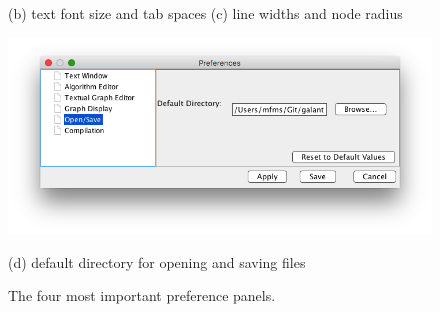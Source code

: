 \begin{figure}
  \vspace{-5ex}

  \hspace*{-2em}
  (b) text font size and tab spaces
  \hspace{3em}
  (c) line widths and node radius

  \medskip
  \includegraphics[scale=0.5]{X-directory_preference}

  \vspace{-5ex}
  (d) default directory for opening and saving files

  \caption{The four most important preference panels.}
  \label{fig:preference_panels}
\end{figure}

